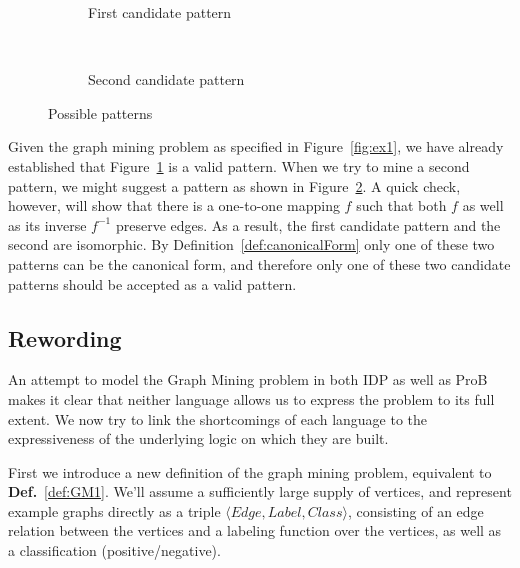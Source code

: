 \documentclass{article}
\theoremstyle{definition}
\newcommand{\triple}[1]{\ensuremath{\langle #1 \rangle}}
\begin{document}
\begin{figure}[h]
\centering
\begin{subfigure}[b]{0.45\textwidth}
    \centering
    \caption{First candidate pattern\label{fig:iso1}}
\end{subfigure}
~
\begin{subfigure}[b]{0.45\textwidth}
    \centering
    \caption{Second candidate pattern\label{fig:iso2}}
\end{subfigure}
\caption{Possible patterns\label{fig:isomorphism}}
\end{figure}

Given the graph mining problem as specified in Figure~\ref{fig:ex1}, we have already established that Figure~\ref{fig:iso1} is a valid pattern.
When we try to mine a second pattern, we might suggest a pattern as shown in Figure~\ref{fig:iso2}.
A quick check, however, will show that there is a one-to-one mapping $f$ such that both $f$ as well as its inverse $f^{-1}$ preserve edges.
As a result, the first candidate pattern and the second are isomorphic.
By Definition~\ref{def:canonicalForm} only one of these two patterns can be the canonical form, and therefore only one of these two candidate patterns should be accepted as a valid pattern.

\subsection{Rewording}

An attempt to model the Graph Mining problem in both IDP as well as ProB makes it clear
that neither language allows us to express the problem to its full extent.
We now try to link the shortcomings of each language to the expressiveness of the underlying logic on which they are built.

First we introduce a new definition of the graph mining problem, equivalent to \textbf{Def.}~\ref{def:GM1}.
We'll assume a sufficiently large supply of vertices, and represent example graphs directly as a triple $\triple{Edge, Label, Class}$, consisting of an edge relation between the vertices and a labeling function over the vertices, as well as a classification (positive/negative).
\end{document}
